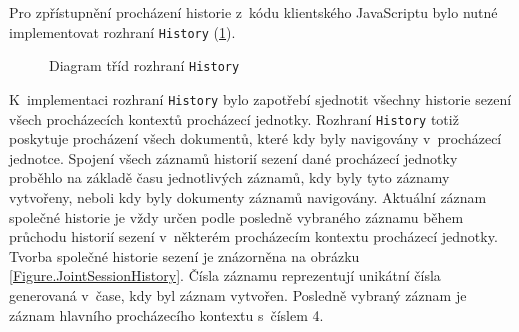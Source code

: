 Pro zpřístupnění procházení historie z~kódu klientského JavaScriptu bylo nutné implementovat rozhraní \texttt{History} (\ref{Figure.History}). 

\bigskip

\begin{figure}[H]
  \begin{center}
    \caption{Diagram tříd rozhraní \texttt{History}}
    \label{Figure.History}
  \end{center}
\end{figure}

K~implementaci rozhraní \texttt{History} bylo zapotřebí sjednotit všechny historie sezení všech procházecích kontextů procházecí jednotky. Rozhraní \texttt{History} totiž poskytuje procházení všech dokumentů, které kdy byly navigovány v~procházecí jednotce. Spojení všech záznamů historií sezení dané procházecí jednotky proběhlo na základě času jednotlivých záznamů, kdy byly tyto záznamy vytvořeny, neboli kdy byly dokumenty záznamů navigovány. Aktuální záznam společné historie je vždy určen podle posledně vybraného záznamu během průchodu historií sezení v~některém procházecím kontextu procházecí jednotky. Tvorba společné historie sezení je znázorněna na obrázku \ref{Figure.JointSessionHistory}. Čísla záznamu reprezentují unikátní čísla generovaná v~čase, kdy byl záznam vytvořen. Posledně vybraný záznam je záznam hlavního procházecího kontextu s~číslem 4.

